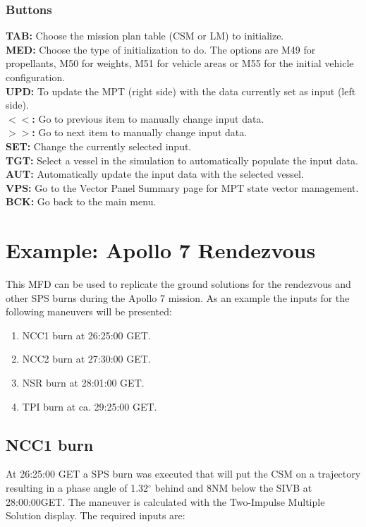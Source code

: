 \documentclass[11pt]{article} %
\begin{document}
\subsubsection{Buttons}
\textbf{TAB:} Choose the mission plan table (CSM or LM) to initialize.\\
\textbf{MED:} Choose the type of initialization to do. The options are M49 for propellants, M50 for weights, M51 for vehicle areas or M55 for the initial vehicle configuration.\\
\textbf{UPD:} To update the MPT (right side) with the data currently set as input (left side).\\
\textbf{$<<$:} Go to previous item to manually change input data.\\
\textbf{$>>$:} Go to next item to manually change input data.\\
\textbf{SET:} Change the currently selected input.\\
\textbf{TGT:} Select a vessel in the simulation to automatically populate the input data.\\
\textbf{AUT:} Automatically update the input data with the selected vessel.\\
\textbf{VPS:} Go to the Vector Panel Summary page for MPT state vector management.\\
\textbf{BCK:} Go back to the main menu.\\
\newpage
\section{Example: Apollo 7 Rendezvous}

This MFD can be used to replicate the ground solutions for the rendezvous and other SPS burns during the Apollo 7 mission. As an example the inputs for the following maneuvers will be presented:

\begin{enumerate}
	\item {NCC1 burn at 26:25:00 GET.}
	\item {NCC2 burn at 27:30:00 GET.}
	\item {NSR burn at 28:01:00 GET.}
	\item {TPI burn at ca. 29:25:00 GET.}
\end{enumerate}

\subsection{NCC1 burn}

At 26:25:00 GET a SPS burn was executed that will put the CSM on a trajectory resulting in a phase angle of 1.32$^{\circ}$ behind and 8NM below the SIVB at 28:00:00GET. The maneuver is calculated with the Two-Impulse Multiple Solution display. The required inputs are:
\end{document}

